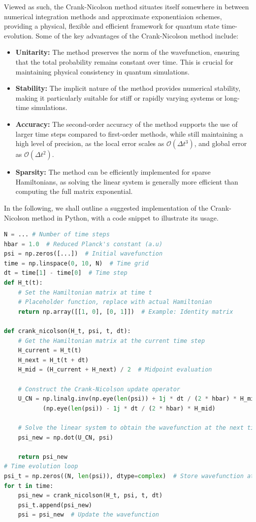 \documentclass{subfiles}
\begin{document}
Viewed as such, the Crank-Nicolson method situates itself somewhere in between numerical integration methods and approximate exponentiaion schemes, providing a physical, flexible and efficient framework for quantum state time-evolution. Some of the key advantages of the Crank-Nicolson method include:
\begin{itemize}
    \item \textbf{Unitarity:} The method preserves the norm of the wavefunction, ensuring that the total probability remains constant over time. This is crucial for maintaining physical consistency in quantum simulations.
    \item \textbf{Stability:} The implicit nature of the method provides numerical stability, making it particularly suitable for stiff or rapidly varying systems or long-time simulations.
    \item \textbf{Accuracy:} The second-order accuracy of the method supports the use of larger time steps compared to first-order methods, while still maintaining a high level of precision, as the local error scales as $\mathcal{O}(\Delta t^3)$, and global error as $\mathcal{O}(\Delta t^2)$.
    \item \textbf{Sparsity:} The method can be efficiently implemented for sparse Hamiltonians, as solving the linear system is generally more efficient than computing the full matrix exponential.
\end{itemize}
In the following, we shall outline a suggested implementation of the Crank-Nicolson method in Python, with a code snippet to illustrate its usage.
\begin{lstlisting}[language=Python]
N = ... # Number of time steps
hbar = 1.0  # Reduced Planck's constant (a.u)
psi = np.zeros([...])  # Initial wavefunction
time = np.linspace(0, 10, N)  # Time grid
dt = time[1] - time[0]  # Time step
def H_t(t):
    # Set the Hamiltonian matrix at time t
    # Placeholder function, replace with actual Hamiltonian
    return np.array([[1, 0], [0, 1]])  # Example: Identity matrix

def crank_nicolson(H_t, psi, t, dt):
    # Get the Hamiltonian matrix at the current time step
    H_current = H_t(t)
    H_next = H_t(t + dt)
    H_mid = (H_current + H_next) / 2  # Midpoint evaluation
    
    # Construct the Crank-Nicolson update operator
    U_CN = np.linalg.inv(np.eye(len(psi)) + 1j * dt / (2 * hbar) * H_mid) @ \
           (np.eye(len(psi)) - 1j * dt / (2 * hbar) * H_mid)
    
    # Solve the linear system to obtain the wavefunction at the next time step
    psi_new = np.dot(U_CN, psi)
    
    return psi_new
# Time evolution loop
psi_t = np.zeros((N, len(psi)), dtype=complex)  # Store wavefunction at each time step
for t in time:
    psi_new = crank_nicolson(H_t, psi, t, dt)
    psi_t.append(psi_new)
    psi = psi_new  # Update the wavefunction
\end{lstlisting}
\end{document}
